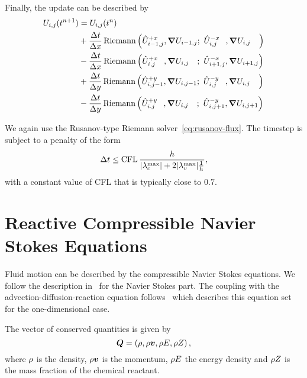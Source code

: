 Finally, the update can be described by
\begin{align}
  \begin{split}
    \cellAvg (t^{n+1}) &= \cellAvg (t^n)
    \\ &+
  \frac{\Delta t}{\Delta x}
    \Riemann \left(
      \evolvedCellAvg[i-1,j]{+x}, \gradCellAvg[i-1,j]; \ %
      \evolvedCellAvg[i,j\phantom{-1}]{-x}, \gradCellAvg[i,j\phantom{-1}]
    \right)
    \\ &-
  \frac{\Delta t}{\Delta x}
    \Riemann \left(
      \evolvedCellAvg[i,j\phantom{+1}]{+x}, \gradCellAvg[i,j\phantom{+1}]; \ %
      \evolvedCellAvg[i+1,j]{-x}, \gradCellAvg[i+1,j]
    \right)
    \\ &+
  \frac{\Delta t}{\Delta y}
    \Riemann \left(
      \evolvedCellAvg[i,j-1]{+y}, \gradCellAvg[i,j-1]; \ %
      \evolvedCellAvg[i,j\phantom{-1}]{-y}, \gradCellAvg[i,j\phantom{-1}]
    \right)
    \\ &-
  \frac{\Delta t}{\Delta y}
    \Riemann \left(
      \evolvedCellAvg[i,j\phantom{+1}]{+y}, \gradCellAvg[i,j\phantom{+1}]; \ %
      \evolvedCellAvg[i,j+1]{-y}, \gradCellAvg[i,j+1]
    \right)    
  \end{split}
\end{align}

We again use the Rusanov-type Riemann solver~\cref{eq:rusanov-flux}.
The timestep is subject to a penalty of the form
\begin{equation}\label{eq:cfl-muscl}
 \Delta t \leq  \text{CFL} \, \frac{h}{\maxConvEigen + 2 \maxViscEigen \frac{1}{h}},
\end{equation}
with a constant value of CFL that is typically close to $0.7$.

\section{Reactive Compressible Navier Stokes Equations}\label{sec:navier-stokes}
Fluid motion can be described by the compressible Navier Stokes equations.
We follow the description in~\cite{dumbser2010arbitrary} for the Navier Stokes part.
The coupling with the advection-diffusion-reaction equation follows~\cite{hidalgo2011ader} which describes this equation set for the one-dimensional case.

The vector of conserved quantities is given by
\begin{equation}
  \label{eq:conserved-variables}
 \bm{Q} = \left( \rho, \rho \bm{v}, \rho E, \rho Z \right),
\end{equation}
where $\rho$ is the density, $\rho \bm{v}$ is the momentum, $\rho E$ the energy density and $\rho Z$ is the mass fraction of the chemical reactant.

